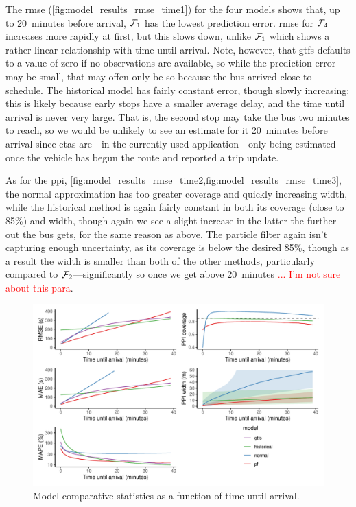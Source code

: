 The \gls{rmse} (\cref{fig:model_results_rmse_time1}) for the four models shows that, up to 20~minutes before arrival, $\mathcal{F}_1$ has the lowest prediction error. \Gls{rmse} for $\mathcal{F}_4$ increases more rapidly at first, but this slows down, unlike $\mathcal{F}_1$ which shows a rather linear relationship with time until arrival.  Note, however, that \gls{gtfs} defaults to a value of zero if no observations are available, so while the prediction error may be small, that may offen only be so because the bus arrived close to schedule. The historical model has fairly constant error, though slowly increasing: this is likely because early stops have a smaller average delay, and the time until arrival is never very large. That is, the second stop may take the bus two minutes to reach, so we would be unlikely to see an estimate for it 20~minutes before arrival since \glspl{eta} are---in the currently used application---only being estimated once the vehicle has begun the route and reported a trip update.


As for the \gls{ppi}, \cref{fig:model_results_rmse_time2,fig:model_results_rmse_time3}, the normal approximation has too greater coverage and quickly increasing width, while the historical method is again fairly constant in both its coverage (close to 85\%) and width, though again we see a slight increase in the latter the further out the bus gets, for the same reason as above. The particle filter again isn't capturing enough uncertainty, as its coverage is below the desired 85\%, though as a result the width is smaller than both of the other methods, particularly compared to $\mathcal{F}_2$---significantly so once we get above 20~minutes  \textcolor{red}{... I'm not sure about this para}.


\begin{knitrout}\small
{}\color{fgcolor}\begin{figure}
\includegraphics[width=\textwidth]{figure/model_results_rmse_time-1} \caption[Model comparative statistics as a function of time until arrival]{Model comparative statistics as a function of time until arrival.}\label{fig:model_results_rmse_time}
\end{figure}


\end{knitrout}



